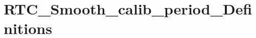 \hypertarget{group___r_t_c___smooth__calib__period___definitions}{\section{R\-T\-C\-\_\-\-Smooth\-\_\-calib\-\_\-period\-\_\-\-Definitions}
\label{group___r_t_c___smooth__calib__period___definitions}
}
